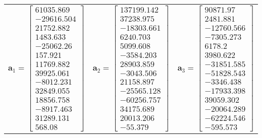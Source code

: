 \documentclass{article}
\newcommand{\mbf}[1]{\ensuremath{\mathbf{#1}}}
\begin{document}
\begin{center}
\begin{tabular}{ ccc }
$\mbf{a}_1 = \left[\begin{matrix}
    61035.869 \\ 
    -29616.504 \\ 
    21752.882 \\ 
    1483.633 \\
    -25062.26 \\ 
    157.921 \\ 
    11769.882 \\ 
    39925.061 \\
    -8012.231 \\ 
    32849.055 \\ 
    18856.758 \\ 
    -8917.463 \\
    31289.131 \\ 
    568.08
\end{matrix}\right]$ & 
$\mbf{a}_2 = \left[\begin{matrix}
    137199.142 \\
    37238.975 \\
    -18303.661 \\
    6240.703 \\
    5099.608 \\
    -3584.203 \\
    28903.859 \\
    -3043.506 \\
    21158.897 \\
    -25565.128 \\
    -60256.757 \\
    34175.689 \\
    20013.206 \\
    -55.379 
\end{matrix}\right]$ & 
$\mbf{a}_3 = \left[\begin{matrix}
    90871.97 \\
    2481.881 \\
    -12760.566 \\
    -7305.273 \\
    6178.2 \\
    3980.622 \\
    -31851.585 \\
    -51828.543 \\
    -3346.438 \\
    -17933.398 \\
    39059.302 \\
    -20064.289 \\
    -62224.546 \\
    -595.573
\end{matrix}\right]$
\end{tabular}
\end{center}
\end{document}
